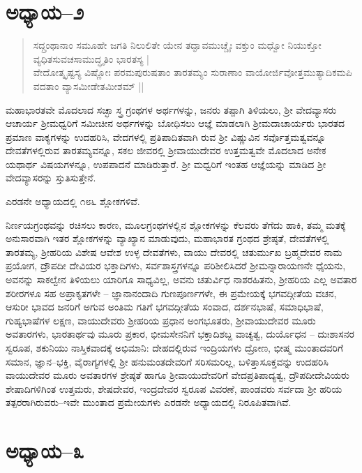 \section{ಅಧ್ಯಾಯ–೨}

\begin{verse}
ಸದ್ಗ್ರಂಥಾನಾಂ ಸಮೂಹೇ ಜಗತಿ ನಿಲುಲಿತೇ ಯೇನ ತದ್ಘಾವಮುಚ್ಚೈಃ ವಕ್ತುಂ ಮಧ್ವೋ ನಿಯುಕ್ತೋ ವ್ಯಧಿತಸುವಚಸಾಮುದ್ಧೃತಿಂ ಭಾರತಸ್ಯ | \\ ವೇದೋತ್ಕೃಷ್ಟಸ್ಯ ವಿಷ್ಣೋಃ ಪರಮಪುರುಷತಾಂ ತಾರತಮ್ಯಂ ಸುರಾಣಾಂ ವಾಯೋರ್ಜಿವೋತ್ತಮುತ್ಯಾದಿಕಮಪಿ ವದತಾಂ ವ್ಯಾಸಮೀಡೇತಮೀಶಮ್ || 
\end{verse}

ಮಹಾಭಾರತವೇ ಮೊದಲಾದ ಸಚ್ಛಾ ಸ್ತ್ರ ಗ್ರಂಥಗಳ ಅರ್ಥಗಳನ್ನು, ಜನರು ತಪ್ಪಾಗಿ ತಿಳಿಯಲು, ಶ‍್ರೀ ವೇದವ್ಯಾಸರು ಆಚಾರ್ಯ ಶ‍್ರೀಮಧ್ವರಿಗೆ ಸಮೀಚೀನ ಅರ್ಥಗಳನ್ನು ಬೋಧಿಸಲು ಆಜ್ಞೆ ಮಾಡಲಾಗಿ ಶ‍್ರೀಮದಾಚಾರ್ಯರು ಭಾರತದ ಪ್ರಮಾಣ ವಾಕ್ಯಗಳನ್ನು ಉದಹರಿಸಿ, ವೇದಗಳಲ್ಲಿ ಪ್ರತಿಪಾದಿತವಾಗಿ ರುವ ಶ‍್ರೀ ವಿಷ್ಣುವಿನ ಸರ್ವೊತ್ತಮತ್ವವನ್ನೂ ದೇವತೆಗಳಲ್ಲಿರುವ ತಾರತಮ್ಯವನ್ನೂ, ಸಕಲ ಜೀವರಲ್ಲಿ ಶ‍್ರೀವಾಯುದೇವರ ಉತ್ತಮತ್ವವೇ ಮೊದಲಾದ ಅನೇಕ ಯಥಾರ್ಥ ವಿಷಯಗಳನ್ನೂ, ಉಪಪಾದನೆ ಮಾಡಿರುತ್ತಾರೆ. ಶ‍್ರೀ ಮಧ್ವರಿಗೆ ಇಂತಹ ಆಜ್ಞೆಯನ್ನು ಮಾಡಿದ ಶ‍್ರೀ ವೇದವ್ಯಾಸರನ್ನು ಸ್ತುತಿಸುತ್ತೇನೆ.

ಎರಡನೇ ಅಧ್ಯಾಯದಲ್ಲಿ ೧೮೬ ಶ್ಲೋಕಗಳಿವೆ.

ನಿರ್ಣಯಗ್ರಂಥವನ್ನು ರಚಿಸಲು ಕಾರಣ, ಮೂಲಗ್ರಂಥಗಳಲ್ಲಿನ ಶ್ಲೋಕಗಳನ್ನು ಕೆಲವರು ತೆಗೆದು ಹಾಕಿ, ತಮ್ಮ ಮತಕ್ಕೆ ಅನುಸಾರವಾಗಿ ಇತರ ಶ್ಲೋಕಗಳನ್ನು ವ್ಯಾಖ್ಯಾನ ಮಾಡುವುದು, ಮಹಾಭಾರತ ಗ್ರಂಥದ ಶ್ರೇಷ್ಠತೆ, ದೇವತೆಗಳಲ್ಲಿ ತಾರತಮ್ಯ, ಶ‍್ರೀಹರಿಯ ವಿಶೇಷ ಆವೇಶ ಉಳ್ಳ ದೇವತೆಗಳು, ವಾಯು ದೇವರಲ್ಲಿ ಚತುರ್ಮುಖ ಬ್ರಹ್ಮದೇವರ ನಾಮ ಪ್ರಯೋಗ, ದ್ರೌಪದೀ ದೇವಿಯರ ಭಕ್ತಾದಿಗಳು, ಸರ್ವಶಾಸ್ತ್ರಗಳನ್ನೂ ಪರಿಶೀಲಿಸಿದರೆ ಶ‍್ರೀಮನ್ನಾರಾಯಣನೇ ಧೈಯನು, ಅವನನ್ನು ಸಾಕಲ್ವೇನ ತಿಳಿಯಲು ಯಾರಿಗೂ ಸಾಧ್ಯವಿಲ್ಲ, ಅವನು ಚತುರ್ವಿಧ ನಾಶರಹಿತನು, ಶ‍್ರೀಹರಿಯ ಎಲ್ಲ ಅವತಾರ ಶರೀರಗಳೂ ಸಹ ಅಪ್ರಾಕೃತಗಳೇ – ಜ್ಞಾನಾನಂದಾದಿ ಗುಣಪೂರ್ಣಗಳೇ, ಈ ಪ್ರಮೇಯಕ್ಕೆ ಭಗವದ್ಗೀತೆಯ ವಚನ, ಆಸುರೀ ಭಾವದ ಜನರಿಗೆ ಅಗುವ ಅಂತಿಮ ಗತಿಗೆ ಭಗವದ್ಗೀತೆಯ ಸಂವಾದ, ದರ್ಶನಭಾಷೆ, ಸಮಾಧಿಭಾಷೆ, ಗುಹ್ಯಭಾಷೆಗಳ ಲಕ್ಷಣ, ವಾಯುದೇವರು ಶ‍್ರೀಹರಿಯ ಪ್ರಧಾನ ಅಂಗಭೂತರು, ಶ‍್ರೀವಾಯುದೇವರ ಮೂರು ಅವತಾರಗಳು, ಭಾರತಾರ್ಥವು ಮೂರು ಪ್ರಕಾರ, ಭೀಮಸೇನನಿಗೆ ಭಕ್ತಾದಿಶಬ್ದ ವಾಚ್ಯತ್ವ, ದುರ್ಯೊಧನ – ದುಃಶಾಸನರ ಸ್ವರೂಪ, ಶಕುನಿಯು ನಾಸ್ತಿಕವಾದಕ್ಕೆ ಅಭಿಮಾನಿ: ದೇಹದಲ್ಲಿರುವ ಇಂದ್ರಿಯಗಳು ದ್ರೋಣ, ಭೀಷ್ಮ ಮುಂತಾದವರಿಗೆ ಸಮಾನ, ಜ್ಞಾನ–ಭಕ್ತಿ, ವೈರಾಗ್ಯಗಳಲ್ಲಿ ಶ‍್ರೀ ಹನುಮಂತದೇವರಿಗೆ ಸರಿಸಮರಿಲ್ಲ, ಬಳಿತ್ತಾಸೂಕ್ತವನ್ನು ಉದಹರಿಸಿ ವಾಯುದೇವರ ಮೂರು ಅವತಾರಗಳ ಶ್ರೇಷ್ಠತೆ ಹಾಗೂ ಶ‍್ರೀವಾಯುದೇವರಿಗೆ ವೇದಪ್ರತಿಪಾದ್ಯತ್ವ, ದ್ರೌಪದೀದೇವಿಯರು ಶೇಷಾದಿಗಳಿಗಿಂತ ಉತ್ತಮರು, ಶೇಷದೇವರ, ಇಂದ್ರದೇವರ ಸ್ವರೂಪ ವಿವರಣೆ, ಪಾಂಡವರು ಸರ್ವದಾ ಶ‍್ರೀ ಹರಿಯ ತತ್ಪರರಾಗಿರುವರು–ಇವೇ ಮುಂತಾದ ಪ್ರಮೇಯಗಳು ಎರಡನೇ ಅಧ್ಯಾಯದಲ್ಲಿ ನಿರೂಪಿತವಾಗಿವೆ.


\section{ಅಧ್ಯಾಯ–೩}

